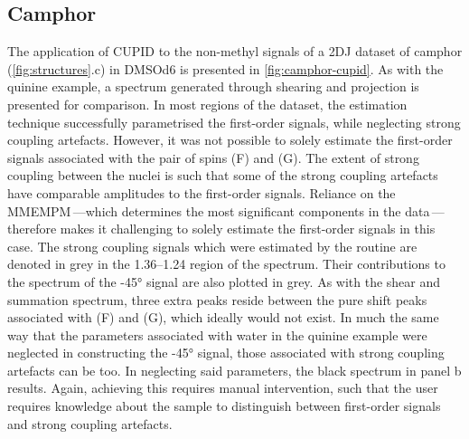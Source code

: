 \subsection{Camphor}
The application of \ac{CUPID} to the non-methyl signals of a \ac{2DJ}
dataset of camphor (\cref{fig:structures}.c) in \acs{DMSOd6} is presented
in \cref{fig:camphor-cupid}. As with the quinine example, a spectrum
generated through shearing and projection is presented for
comparison. In most regions of the dataset, the estimation technique
successfully parametrised the first-order signals, while neglecting strong
coupling artefacts. However, it was not possible to solely estimate the
first-order signals associated with the pair of spins (F) and (G). The extent
of strong coupling between the nuclei is such that some of the strong coupling
artefacts have comparable amplitudes to the first-order signals. Reliance on
the
\ac{MMEMPM}\,---which determines the most significant components in
the data\,---therefore makes it challenging to solely estimate the first-order
signals in this case. The strong coupling signals which were estimated by the
routine are denoted in grey in the \SIrange{1.36}{1.24}{\partspermillion} region
of the spectrum. Their contributions to the spectrum of the \ang{-45} signal
are also plotted in grey. As with the shear and summation spectrum, three extra
peaks reside between the pure shift peaks associated with (F) and (G), which
ideally would not exist. In much the same way that the parameters associated
with water in the quinine example were neglected in constructing the \ang{-45}
signal, those associated with strong coupling artefacts can be too.
In neglecting said parameters, the black spectrum in panel b
results. Again, achieving this requires manual intervention, such that the user
requires knowledge about the sample to distinguish between first-order signals
and strong coupling artefacts.

